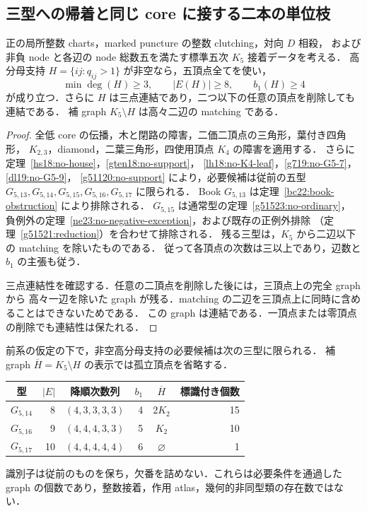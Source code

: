 \subsection{三型への帰着と同じ core に接する二本の単位枝}
\label{sf23:section}\label{sf22:section}\label{sf21:section}\label{sf20:section}

\begin{corollary}[非空支持の最小次数と三点連結性]
\label{sf23:no-leaves}\label{sf22:no-leaves}\label{sf21:no-leaves}\label{sf20:no-leaves}
正の局所整数 charts，marked puncture の整数 clutching，対向 $D$ 相殺，
および非負 node と各辺の node 総数五を満たす標準五次 $K_5$ 接着データを考える．
高分母支持 $H=\{ij:q_{ij}>1\}$ が非空なら，五頂点全てを使い，
\[
 \min\deg(H)\ge3,\qquad |E(H)|\ge8,\qquad b_1(H)\ge4
\]
が成り立つ．さらに $H$ は三点連結であり，二つ以下の任意の頂点を削除しても連結である．
補 graph $K_5\setminus H$ は高々二辺の matching である．
\end{corollary}

\begin{proof}
全低 core の伝播，木と閉路の障害，二価二頂点の三角形，葉付き四角形，
$K_{2,3}$，diamond，二葉三角形，四使用頂点 $K_4$ の障害を適用する．
さらに定理~\ref{hs18:no-house}，\ref{gten18:no-support}，
\ref{lh18:no-K4-leaf}，\ref{g719:no-G5-7}，\ref{dl19:no-G5-9}，
\ref{g51120:no-support} により，必要候補は従前の五型
$G_{5,13},G_{5,14},G_{5,15},G_{5,16},G_{5,17}$ に限られる．
Book $G_{5,13}$ は定理~\ref{bc22:book-obstruction} により排除される．
$G_{5,15}$ は通常型の定理~\ref{g51523:no-ordinary}，
負例外の定理~\ref{ne23:no-negative-exception}，および既存の正例外排除
（定理~\ref{g51521:reduction}）を合わせて排除される．
残る三型は，$K_5$ から二辺以下の matching を除いたものである．
従って各頂点の次数は三以上であり，辺数と $b_1$ の主張も従う．

三点連結性を確認する．任意の二頂点を削除した後には，三頂点上の完全 graph から
高々一辺を除いた graph が残る．matching の二辺を三頂点上に同時に含めることはできないためである．
この graph は連結である．一頂点または零頂点の削除でも連結性は保たれる．
\end{proof}

\begin{corollary}[三型・二十六標識]
\label{sf23:remaining-support}\label{sf22:remaining-support}\label{sf21:remaining-support}\label{sf20:remaining-support}
前系の仮定の下で，非空高分母支持の必要候補は次の三型に限られる．
補 graph $\overline H=K_5\setminus H$ の表示では孤立頂点を省略する．
\begin{center}\small
\begin{tabular}{crcrcr}
型&$|E|$&降順次数列&$b_1$&$\overline H$&標識付き個数\\\hline
$G_{5,14}$&8&$(4,3,3,3,3)$&4&$2K_2$&15\\
$G_{5,16}$&9&$(4,4,4,3,3)$&5&$K_2$&10\\
$G_{5,17}$&10&$(4,4,4,4,4)$&6&$\varnothing$&1
\end{tabular}
\end{center}
識別子は従前のものを保ち，欠番を詰めない．これらは必要条件を通過した
graph の個数であり，整数接着，作用 atlas，幾何的非同型類の存在数ではない．
\end{corollary}

